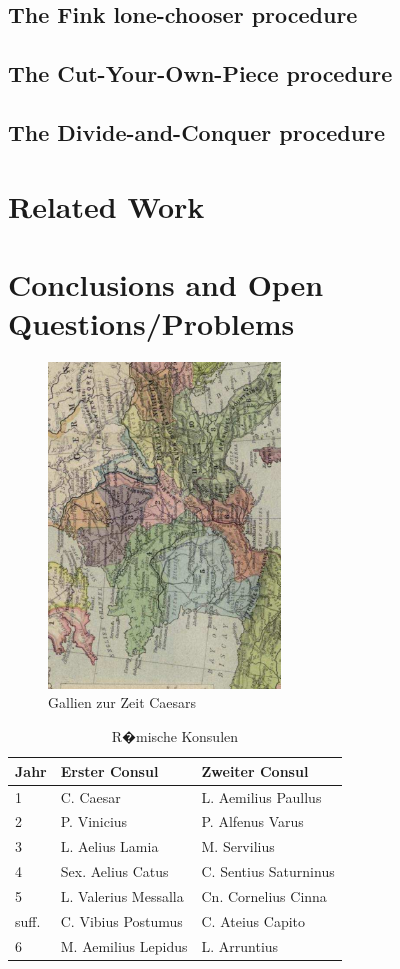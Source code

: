 \subsection{The Fink lone-chooser procedure}
\subsection{The Cut-Your-Own-Piece procedure}
\subsection{The Divide-and-Conquer procedure}
\section{Related Work}
\section{Conclusions and Open Questions/Problems}
\begin{figure}[htb]
\begin{center}
  \includegraphics[width=175pt, angle=270]{bilder/Galia}
  \caption{Gallien zur Zeit Caesars}\label{fig_Gallien}
\end{center}
\end{figure}


\begin{table}[htb]
\begin{center}
\begin{tabular}{|l|l|l|}
\hline
Jahr &  Erster Consul & Zweiter Consul\\
\hline \hline
1 & C. Caesar         & L. Aemilius Paullus\\
2 & P. Vinicius       & P. Alfenus Varus\\
3 & L. Aelius Lamia   & M. Servilius\\
4 & Sex. Aelius Catus &  C. Sentius Saturninus\\
5 & L. Valerius Messalla& Cn. Cornelius Cinna \\
suff. & C. Vibius Postumus &  C. Ateius Capito\\
6 & M. Aemilius Lepidus & L. Arruntius\\
\hline
\end{tabular}
 \caption{R�mische Konsulen}\label{tab_Konsulen}
\end{center}
\end{table}


